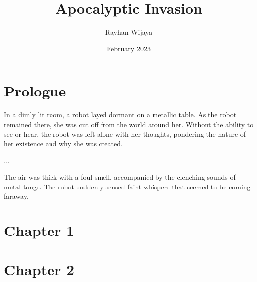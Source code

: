 \documentclass[12pt]{book}
\title{Apocalyptic Invasion}
\author{Rayhan Wijaya}
\date{February 2023}
\begin{document}
\maketitle

\section*{Prologue}

In a dimly lit room, a robot layed dormant on a metallic table. As the
robot remained there, she was cut off from the world around her.
Without the ability to see or hear, the robot was left alone with her
thoughts, pondering the nature of her existence and why she was
created.

...

The air was thick with a foul smell, accompanied by the clenching
sounds of metal tongs. The robot suddenly sensed faint whispers that
seemed to be coming faraway.

\section*{Chapter 1}

\section*{Chapter 2}
\end{document}
